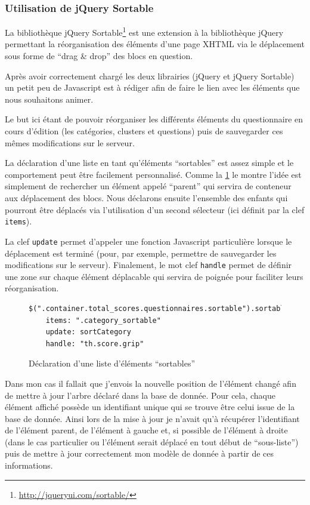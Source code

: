 \documentclass[12pt,a4paper]{book}
\begin{document}
\subsubsection{Utilisation de jQuery Sortable}

La bibliothèque jQuery Sortable\footnote{\url{http://jqueryui.com/sortable/}} est une extension à la bibliothèque jQuery permettant la réorganisation des éléments d'une page XHTML via le déplacement sous forme de ``drag \& drop'' des blocs en question.

Après avoir correctement chargé les deux librairies (jQuery et jQuery Sortable) un petit peu de Javascript est à rédiger afin de faire le lien avec les éléments que nous souhaitons animer.

Le but ici étant de pouvoir réorganiser les différents éléments du questionnaire en cours d'édition (les catégories, clusters et questions) puis de sauvegarder ces mêmes modifications sur le serveur.

La déclaration d'une liste en tant qu'éléments ``sortables'' est assez simple et le comportement peut être facilement personnalisé. Comme la \cref{fig.sort1} le montre l'idée est simplement de rechercher un élément appelé ``parent'' qui servira de conteneur aux déplacement des blocs. Nous déclarons ensuite l'ensemble des enfants qui pourront être déplacés via l'utilisation d'un second sélecteur (ici définit par la clef \texttt{items}).

La clef \texttt{update} permet d'appeler une fonction Javascript particulière lorsque le déplacement est terminé (pour, par exemple, permettre de sauvegarder les modifications sur le serveur). Finalement, le mot clef \texttt{handle} permet de définir une zone sur chaque élément déplacable qui servira de poignée pour faciliter leurs réorganisation.

\begin{figure}[h]
\begin{lstlisting}
$(".container.total_scores.questionnaires.sortable").sortable
    items: ".category_sortable"
    update: sortCategory
    handle: "th.score.grip"
\end{lstlisting}
 \caption{Déclaration d'une liste d'éléments ``sortables''}
 \label{fig.sort1}
\end{figure}

Dans mon cas il fallait que j'envois la nouvelle position de l'élément changé afin de mettre à jour l'arbre déclaré dans la base de donnée. Pour cela, chaque élément affiché possède un identifiant unique qui se trouve être celui issue de la base de donnée. Ainsi lors de la mise à jour je n'avait qu'à récupérer l'identifiant de l'élément parent, de l'élément à gauche et, si possible de l'élément à droite (dans le cas particulier ou l'élément serait déplacé en tout début de ``sous-liste'') puis de mettre à jour correctement mon modèle de donnée à partir de ces informations.
\end{document}
